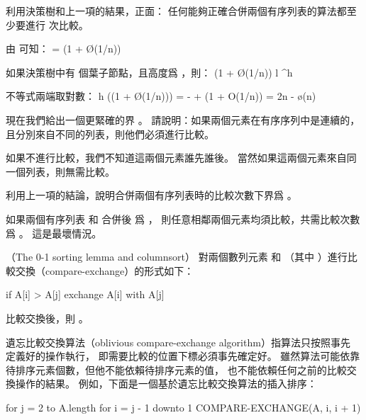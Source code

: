 \startANSWER
\startformula
{}
\stopformula
\stopANSWER

\startitem
利用決策樹和上一項的結果，正面：
任何能夠正確合併兩個有序列表的算法都至少要進行  次比較。
\stopitem

\startANSWER
由 可知：
\startformula
{} = (1 + \O(1/n))
\stopformula

如果決策樹中有  個葉子節點，且高度爲 ，則：
\startformula
{}(1 + \O(1/n)) \le l ^h
\stopformula

不等式兩端取對數：
\startformula\startmathalignment
\NC h \NC \ge \lg\left((1 + \O(1/n))\right) \NR
\NC   \NC =  - \lg{} + \lg(1 + O(1/n)) \NR
\NC   \NC = 2n - \o(n) \NR
\stopmathalignment\stopformula
\stopANSWER
\stopigBase

現在我們給出一個更緊確的界 。
\startigBase[a,continue]
\startitem
請說明：如果兩個元素在有序序列中是連續的，且分別來自不同的列表，則他們必須進行比較。
\stopitem

\startANSWER
如果不進行比較，我們不知道這兩個元素誰先誰後。
當然如果這兩個元素來自同一個列表，則無需比較。
\stopANSWER

\startitem
利用上一項的結論，說明合併兩個有序列表時的比較次數下界爲 。
\stopitem

\startANSWER
如果兩個有序列表  和  合併後
爲 ，
則任意相鄰兩個元素均須比較，共需比較次數爲 。
這是最壞情況。
\stopANSWER
\stopigBase
\stopPROBLEM

\startPROBLEM
（The 0-1 sorting lemma and columnsort）
對兩個數列元素  和  （其中 ）進行{\EMP 比較交換}（{\EMP compare-exchange}）的形式如下：

\startCLRS
if A[i] > A[j]
	exchange A[i] with A[j]
\stopCLRS

比較交換後，則 。

{\EMP 遺忘比較交換算法（oblivious compare-exchange algorithm）}指算法只按照事先
定義好的操作執行，
即需要比較的位置下標必須事先確定好。
雖然算法可能依靠待排序元素個數，但他不能依賴待排序元素的值，
也不能依賴任何之前的比較交換操作的結果。
例如，下面是一個基於遺忘比較交換算法的插入排序：

\startCLRS
for j = 2 to A.length
	for i = j - 1 downto 1
		COMPARE-EXCHANGE(A, i, i + 1)
\stopCLRS

